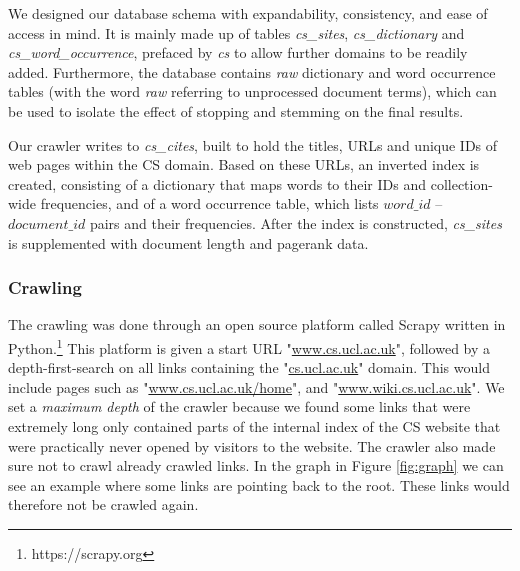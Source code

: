 We designed our database schema with expandability, consistency, and ease of access in mind. It is mainly made up of tables \emph{cs\_sites}, \emph{cs\_dictionary} and \emph{cs\_word\_occurrence}, prefaced by \emph{cs} to allow further domains to be readily added. Furthermore, the database contains \emph{raw} dictionary and word occurrence tables (with the word \emph{raw} referring to unprocessed document terms), which can be used to isolate the effect of stopping and stemming on the final results.

Our crawler writes to \emph{cs\_cites}, built to hold the titles, URLs and unique IDs of web pages within the CS domain.
Based on these URLs, an inverted index is created, consisting of a dictionary that maps words to their IDs and collection-wide frequencies, and of a word occurrence table, which lists $word\_id$ -- $document\_id$ pairs and their frequencies. After the index is constructed, \emph{cs\_sites} is supplemented with document length and pagerank data.


\subsubsection{Crawling} %
\label{ssub:crawling}

The crawling was done through an open source platform called Scrapy written in Python.\footnote{https://scrapy.org} This platform is given a start URL "\url{www.cs.ucl.ac.uk}", followed by a depth-first-search on all links containing the "\url{cs.ucl.ac.uk}" domain. This would include pages such as "\url{www.cs.ucl.ac.uk/home}", and "\url{www.wiki.cs.ucl.ac.uk}". We set a \emph{maximum depth} of the crawler because we found some links that were extremely long only contained parts of the internal index of the CS website that were practically never opened by visitors to the website. The crawler also made sure not to crawl already crawled links. In the graph in Figure \ref{fig:graph} we can see an example where some links are pointing back to the root. These links would therefore not be crawled again.

